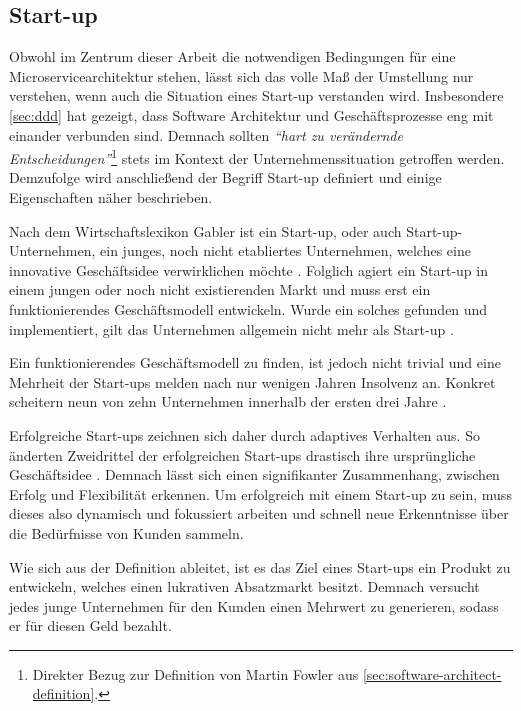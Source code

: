 \subsection{Start-up}
\label{sec:start-up}

Obwohl im Zentrum dieser Arbeit die notwendigen Bedingungen für eine Microservicearchitektur stehen, lässt sich das volle Maß der Umstellung nur verstehen, wenn auch die Situation eines Start-up verstanden wird. Insbesondere \cref{sec:ddd} hat gezeigt, dass Software Architektur und Geschäftsprozesse eng mit einander verbunden sind. Demnach sollten \textit{\enquote{hart zu verändernde Entscheidungen}}\footnote{Direkter Bezug zur Definition von Martin Fowler aus \cref{sec:software-architect-definition}.} stets im Kontext der Unternehmenssituation getroffen werden. Demzufolge wird anschließend der Begriff Start-up definiert und einige Eigenschaften näher beschrieben.

Nach dem Wirtschaftslexikon Gabler ist ein Start-up, oder auch Start-up-Unternehmen, ein junges, noch nicht etabliertes Unternehmen, welches eine innovative Geschäftsidee verwirklichen möchte \parencite[vgl.][]{achleitner_start-up_2018}. Folglich agiert ein Start-up in einem jungen oder noch nicht existierenden Markt und muss erst ein funktionierendes Geschäftsmodell entwickeln. Wurde ein solches gefunden und implementiert, gilt das Unternehmen allgemein nicht mehr als Start-up \parencite[vgl.][]{wiki_start-up-unternehmen_2020}.

Ein funktionierendes Geschäftsmodell zu finden, ist jedoch nicht trivial und eine Mehrheit der Start-ups melden nach nur wenigen Jahren Insolvenz an. Konkret scheitern neun von zehn Unternehmen innerhalb der ersten drei Jahre \parencite[vgl.][]{patel_startups-fail_2015}.

Erfolgreiche Start-ups zeichnen sich daher durch adaptives Verhalten aus. So änderten Zweidrittel der erfolgreichen Start-ups drastisch ihre ursprüngliche Geschäftsidee \parencite{mullins_getting_2009}. Demnach lässt sich einen signifikanter Zusammenhang, zwischen Erfolg und Flexibilität erkennen. Um erfolgreich mit einem Start-up zu sein, muss dieses also dynamisch und fokussiert arbeiten und schnell neue Erkenntnisse über die Bedürfnisse von Kunden sammeln.

Wie sich aus der Definition ableitet, ist es das Ziel eines Start-ups ein Produkt zu entwickeln, welches einen lukrativen Absatzmarkt besitzt. Demnach versucht jedes junge Unternehmen für den Kunden einen Mehrwert zu generieren, sodass er für diesen Geld bezahlt.

